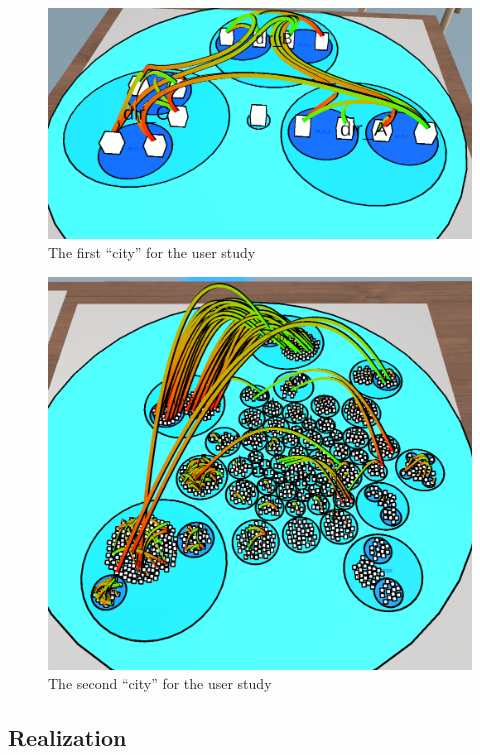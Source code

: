\begin{figure}[htb]
    \centering
    \includegraphics[width=1\textwidth]{Evaluation/img/city_1.png}
    \caption{The first \enquote{\gls{city}} for the user study}\label{fig:city1}
\end{figure}

\begin{figure}[htb]
    \centering
    \includegraphics[width=1\textwidth]{Evaluation/img/city_2.png}
    \caption{The second \enquote{\gls{city}} for the user study}\label{fig:city2}
\end{figure}

\subsection{Realization}
